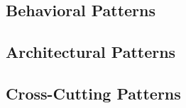 \subsection{Behavioral Patterns}
%

\subsection{Architectural Patterns}
%
%

\subsection{Cross-Cutting Patterns}
\label{sec:bg-protocol-pattern}
%
%

